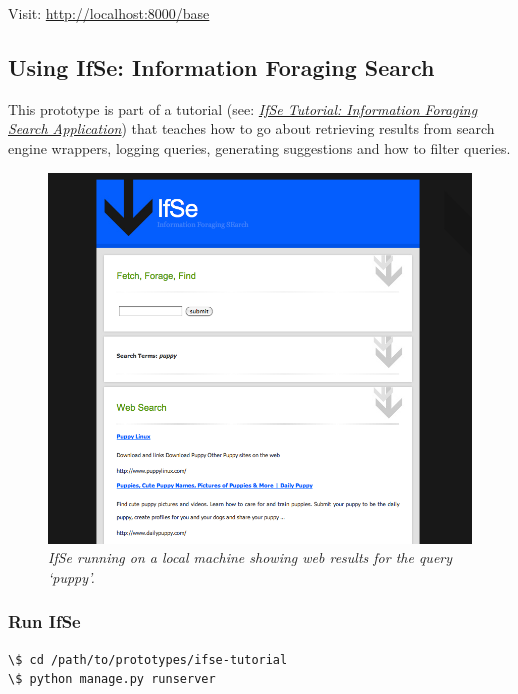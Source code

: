 \documentclass[letterpaper,10pt,english]{sphinxmanual}
\begin{document}
Visit: \href{http://localhost:8000/base}{http://localhost:8000/base}


\subsection{Using IfSe: Information Foraging Search}
\label{prototypes:using-ifse-information-foraging-search}
This prototype is part of a tutorial (see: {\hyperref[ifse-tutorial:information-foraging-puppyir-tutorial]{\emph{IfSe Tutorial: Information Foraging Search Application}}}) that teaches how to go about retrieving results from search engine wrappers, logging queries, generating suggestions and how to filter queries.
\begin{figure}[htbp]
\centering
\capstart

\includegraphics{puppy-ifse-before.png}
\caption{\emph{IfSe running on a local machine showing web results for the query `puppy'.}}\end{figure}


\subsubsection{Run IfSe}
\label{prototypes:run-ifse}
\begin{Verbatim}[commandchars=\\\{\}]
\$ cd /path/to/prototypes/ifse-tutorial
\$ python manage.py runserver
\end{Verbatim}
\end{document}

